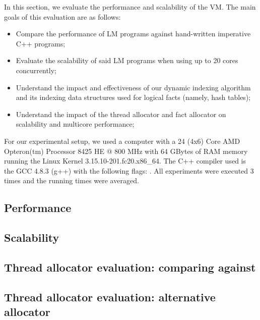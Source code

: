 In this section, we evaluate the performance and scalability of the VM. The main
goals of this evaluation are as follows:

\begin{itemize}
   \item Compare the performance of LM programs against hand-written
      imperative C++ programs;
   \item Evaluate the scalability of said LM programs when using up to 20 cores
      concurrently;
   \item Understand the impact and effectiveness of our dynamic indexing
      algorithm and its indexing data structures used for logical facts (namely,
      hash tables);
   \item Understand the impact of the thread allocator and fact allocator on scalability and
      multicore performance;
\end{itemize}

For our experimental setup, we used a computer with a 24 (4x6) Core AMD
Opteron(tm) Processor 8425 HE $@$ 800 MHz with 64 GBytes of RAM memory running
the Linux Kernel 3.15.10-201.fc20.x86\_64. The C++ compiler used is the GCC
4.8.3 (g++) with the following  flags: .  All experiments were executed 3 times and the running times
were averaged.

\subsection{Performance}


\subsection{Scalability}


\clearpage

\subsection{Thread allocator evaluation: comparing against }


\subsection{Thread allocator evaluation: alternative allocator}\label{section:implementation:alternative_allocator}

